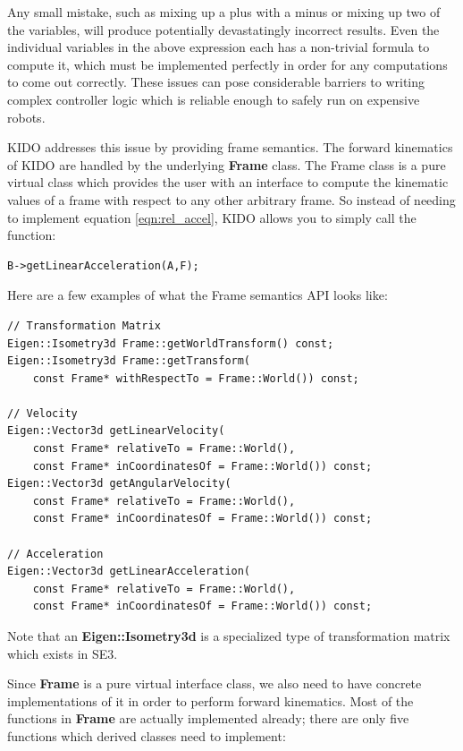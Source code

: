 Any small mistake, such as mixing up a plus with a minus or mixing up two of the variables, will produce potentially devastatingly incorrect results. Even the individual variables in the above expression each has a non-trivial formula to compute it, which must be implemented perfectly in order for any computations to come out correctly. These issues can pose considerable barriers to writing complex controller logic which is reliable enough to safely run on expensive robots.

KIDO addresses this issue by providing frame semantics. The forward kinematics of KIDO are handled by the underlying \textbf{Frame} class. The Frame class is a pure virtual class which provides the user with an interface to compute the kinematic values of a frame with respect to any other arbitrary frame. So instead of needing to implement equation \ref{eqn:rel_accel}, KIDO allows you to simply call the function:

\begin{lstlisting}
B->getLinearAcceleration(A,F);
\end{lstlisting}

Here are a few examples of what the Frame semantics API looks like:

\begin{lstlisting}
// Transformation Matrix
Eigen::Isometry3d Frame::getWorldTransform() const;
Eigen::Isometry3d Frame::getTransform(
    const Frame* withRespectTo = Frame::World()) const;

// Velocity
Eigen::Vector3d getLinearVelocity(
    const Frame* relativeTo = Frame::World(),
    const Frame* inCoordinatesOf = Frame::World()) const;
Eigen::Vector3d getAngularVelocity(
    const Frame* relativeTo = Frame::World(),
    const Frame* inCoordinatesOf = Frame::World()) const;
    
// Acceleration
Eigen::Vector3d getLinearAcceleration(
    const Frame* relativeTo = Frame::World(),
    const Frame* inCoordinatesOf = Frame::World()) const;
\end{lstlisting}

Note that an \textbf{Eigen::Isometry3d} is a specialized type of transformation matrix which exists in SE3.

Since \textbf{Frame} is a pure virtual interface class, we also need to have concrete implementations of it in order to perform forward kinematics. Most of the functions in \textbf{Frame} are actually implemented already; there are only five functions which derived classes need to implement:

